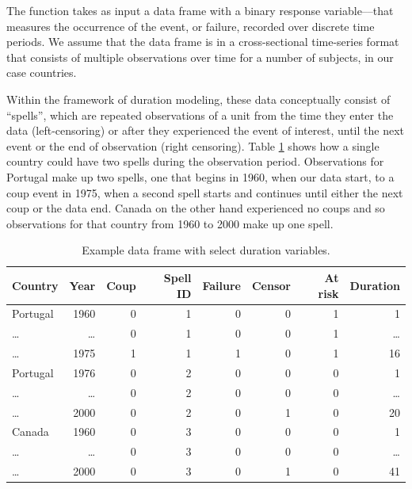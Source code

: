 The  function takes as input a data frame with a
binary response variable----that measures the occurrence of the
event, or failure, recorded over discrete time periods. We assume that
the data frame is in a cross-sectional time-series format that consists
of multiple observations over time for a number of subjects, in our case
countries.

Within the framework of duration modeling, these data conceptually
consist of ``spells'', which are repeated observations of a unit from
the time they enter the data (left-censoring) or after they experienced
the event of interest, until the next event or the end of observation
(right censoring). Table \ref{tab-ex} shows how a single country could
have two spells during the observation period. Observations for Portugal
make up two spells, one that begins in 1960, when our data start, to a
coup event in 1975, when a second spell starts and continues until
either the next coup or the data end. Canada on the other hand
experienced no coups and so observations for that country from 1960 to
2000 make up one spell.

\begin{table}
\begin{center}
\begin{tabular}{lrrrrrrr} \toprule
Country & Year & Coup & Spell ID & Failure & Censor & At risk & Duration \\ \midrule
Portugal & 1960   & 0 & 1 & 0 & 0 & 1 & 1  \\ 
\ldots   & \ldots & 0 & 1 & 0 & 0 & 1 & \ldots \\
\ldots   & 1975   & 1 & 1 & 1 & 0 & 1 & 16 \\ \midrule
Portugal & 1976   & 0 & 2 & 0 & 0 & 0 & 1 \\
\ldots   & \ldots & 0 & 2 & 0 & 0 & 0 & \ldots \\
\ldots   & 2000   & 0 & 2 & 0 & 1 & 0 & 20  \\ \midrule
Canada   & 1960   & 0 & 3 & 0 & 0 & 0 & 1 \\
\ldots   & \ldots & 0 & 3 & 0 & 0 & 0 & \ldots \\ 
\ldots   & 2000   & 0 & 3 & 0 & 1 & 0 & 41 \\ \bottomrule
\end{tabular}
\end{center}
\caption{Example data frame with select duration variables.} \label{tab-ex}
\end{table}

